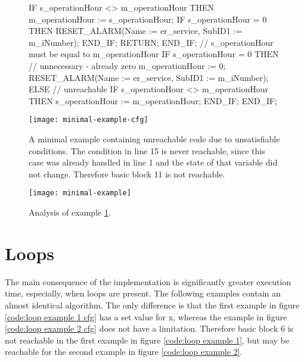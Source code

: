 \begin{figure}[h!]
	\begin{GenericCode}
IF s_operationHour <> m_operationHour THEN
	m_operationHour := s_operationHour;
	IF s_operationHour = 0 THEN
		RESET_ALARM(Name := er_service, SubID1 := m_iNumber);
	END_IF;
	RETURN;
END_IF;
// s_operationHour must be equal to m_operationHour
IF s_operationHour = 0 THEN
	// unnecessary - already zero
	m_operationHour := 0;
	RESET_ALARM(Name := er_service, SubID1 := m_iNumber);
ELSE
	// unreachable
	IF s_operationHour <> m_operationHour THEN
		s_operationHour := m_operationHour;
	END_IF;
END_IF;	\end{GenericCode}
	\centering

	\texttt{[image: minimal-example-cfg]}
	\caption{A minimal example containing unreachable code due to unsatisfiable conditions. The condition in line 15 is never reachable, since this case was already handled in line 1 and the state of that variable did not change. Therefore basic block 11 is not reachable.}
	\label{code:basic example 1 cfg}
\end{figure}

\begin{figure}[h!]
	\centering
	\texttt{[image: minimal-example]}
	\caption{Analysis of example \ref{code:basic example 1 cfg}. }
	\label{code:basic example 1}
\end{figure}
\clearpage
\pagebreak
\section{Loops}
The main consequence of the implementation is significantly greater execution time, especially, when loops are present.
The following examples contain an almost identical algorithm. The only difference is that the first example in figure \ref{code:loop example 1 cfg} has a set value for x, whereas the example in figure \ref{code:loop example 2 cfg} does not have a limitation. Therefore basic block 6 is not reachable in the first example in figure \ref{code:loop example 1}, but may be reachable for the second example in figure \ref{code:loop example 2}.





